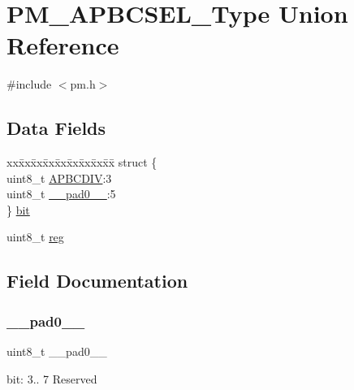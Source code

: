 \hypertarget{union_p_m___a_p_b_c_s_e_l___type}{}\section{P\+M\+\_\+\+A\+P\+B\+C\+S\+E\+L\+\_\+\+Type Union Reference}
\label{union_p_m___a_p_b_c_s_e_l___type}


{\ttfamily \#include $<$pm.\+h$>$}

\subsection*{Data Fields}
\begin{DoxyCompactItemize}
\item 
\begin{tabbing}
xx\=xx\=xx\=xx\=xx\=xx\=xx\=xx\=xx\=\kill
struct \{\\
\>uint8\_t \mbox{\hyperlink{union_p_m___a_p_b_c_s_e_l___type_a7a9c3177b8ff6ce1b9d20245e37c8291}{APBCDIV}}:3\\
\>uint8\_t \mbox{\hyperlink{union_p_m___a_p_b_c_s_e_l___type_a8b4eebe79ded0459acec2f4950102ba3}{\_\_pad0\_\_}}:5\\
\} \mbox{\hyperlink{union_p_m___a_p_b_c_s_e_l___type_a9493cc559ccf6f636240276cf8468b45}{bit}}\\

\end{tabbing}\item 
uint8\+\_\+t \mbox{\hyperlink{union_p_m___a_p_b_c_s_e_l___type_a9428adc9af4653a2050e2536b55dec8d}{reg}}
\end{DoxyCompactItemize}


\subsection{Field Documentation}
\mbox{\label{union_p_m___a_p_b_c_s_e_l___type_a8b4eebe79ded0459acec2f4950102ba3}} 
\subsubsection{\texorpdfstring{\_\_pad0\_\_}{\_\_pad0\_\_}}
{\footnotesize\ttfamily uint8\+\_\+t \+\_\+\+\_\+pad0\+\_\+\+\_\+}

bit\+: 3.. 7 Reserved \mbox{\label{union_p_m___a_p_b_c_s_e_l___type_a7a9c3177b8ff6ce1b9d20245e37c8291}} 
